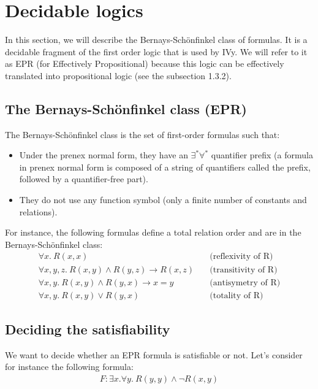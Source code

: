 \documentclass[11pt,a4paper,oldfontcommands,openany]{memoir}
\begin{document}
    \section{Decidable logics}

    In this section, we will describe the Bernays-Schönfinkel class of formulas. It is a decidable fragment of the first order logic that is used by IVy.
    We will refer to it as EPR (for Effectively Propositional) because this logic can be effectively translated into propositional logic (see the subsection 1.3.2).

        \subsection{The Bernays-Schönfinkel class (EPR)}

        The Bernays-Schönfinkel class is the set of first-order formulas such that:
        \begin{itemize}
            \item Under the prenex normal form, they have an \(\exists^*\forall^*\) quantifier prefix
            (a formula in prenex normal form is composed of a string of quantifiers called the prefix, followed by a quantifier-free part).
            \item They do not use any function symbol (only a finite number of constants and relations).
        \end{itemize}

        For instance, the following formulas define a total relation order and are in the Bernays-Schönfinkel class:
        \begin{align*}
            \forall x. \ R(x,x) &\quad\text{(reflexivity of R)}\\
            \forall x,y,z. \ R(x,y) \land R(y,z) \rightarrow R(x,z) &\quad\text{(transitivity of R)}\\
            \forall x,y. \ R(x,y) \land R(y,x) \rightarrow x=y &\quad\text{(antisymetry of R)}\\
            \forall x,y. \ R(x,y) \lor R(y,x) &\quad\text{(totality of R)}
        \end{align*}

        \subsection{Deciding the satisfiability}

        We want to decide whether an EPR formula is satisfiable or not. Let's consider for instance the following formula:
        \begin{align*}
            F: \exists x. \forall y. \ R(y,y) \land \neg R(x,y)
        \end{align*}
\end{document}
